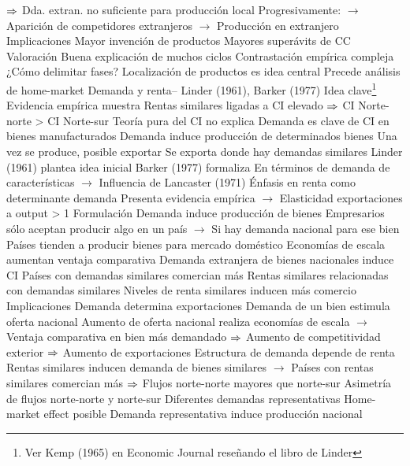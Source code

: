 \documentclass{nuevotema}
\begin{document}
\begin{esquemal}
				\4[] $\then$ Dda. extran. no suficiente para producción local
				\4[] Progresivamente:
				\4[] $\to$ Aparición de competidores extranjeros
				\4[] $\to$ Producción en extranjero
			\3 Implicaciones
				\4 Mayor invención de productos
				\4[] Mayores superávits de CC
			\3 Valoración
				\4 Buena explicación de muchos ciclos
				\4 Contrastación empírica compleja
				\4[] ¿Cómo delimitar fases?
				\4 Localización de productos es idea central
				\4[] Precede análisis de home-market
		\2 Demanda y renta-- Linder (1961), Barker (1977)
			\3 Idea clave\footnote{Ver Kemp (1965) en Economic Journal reseñando el libro de Linder}
				\4 Evidencia empírica muestra
				\4[] Rentas similares ligadas a CI elevado
				\4[] $\then$ CI Norte-norte > CI Norte-sur
				\4[$\then$] Teoría pura del CI no explica
				\4 Demanda es clave de CI en bienes manufacturados
				\4 Demanda induce producción de determinados bienes
				\4 Una vez se produce, posible exportar
				\4 Se exporta donde hay demandas similares
				\4 Linder (1961) plantea idea inicial
				\4 Barker (1977) formaliza
				\4[] En términos de demanda de características
				\4[] $\to$ Influencia de Lancaster (1971)
				\4[] Énfasis en renta como determinante demanda
				\4[] Presenta evidencia empírica
				\4[] $\to$ Elasticidad exportaciones a output > 1
			\3 Formulación
				\4 Demanda induce producción de bienes
				\4[] Empresarios sólo aceptan producir algo en un país
				\4[] $\to$ Si hay demanda nacional para ese bien
				\4 Países tienden a producir bienes para mercado doméstico
				\4 Economías de escala aumentan ventaja comparativa
				\4 Demanda extranjera de bienes nacionales induce CI
				\4[$\then$] Países con demandas similares comercian más
				\4[$\then$] Rentas similares relacionadas con demandas similares
				\4[$\then$] Niveles de renta similares inducen más comercio
			\3 Implicaciones
				\4 Demanda determina exportaciones
				\4[] Demanda de un bien estimula oferta nacional
				\4[] Aumento de oferta nacional realiza economías de escala
				\4[] $\to$ Ventaja comparativa en bien más demandado
				\4[] $\then$ Aumento de competitividad exterior
				\4[] $\then$ Aumento de exportaciones
				\4 Estructura de demanda depende de renta
				\4[] Rentas similares inducen demanda de bienes similares
				\4[] $\to$ Países con rentas similares comercian más
				\4[] $\then$ Flujos norte-norte mayores que norte-sur
				\4 Asimetría de flujos norte-norte y norte-sur
				\4[] Diferentes demandas representativas
				\4 Home-market effect posible
				\4[] Demanda representativa induce producción nacional

\end{esquemal}
\end{document}
